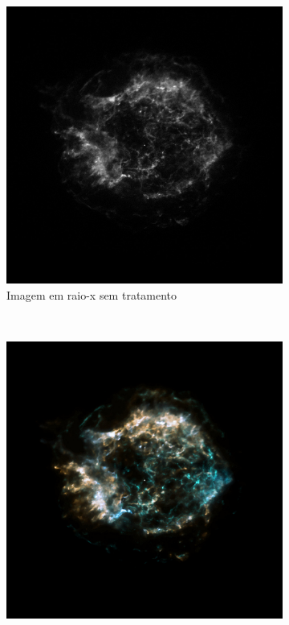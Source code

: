 \documentclass[
	article,			%
	12pt,				%
	oneside,			%
	a4paper,			%
	english,			%
	brazil,				%
	sumario=tradicional
	]{abntex2}
\begin{document}
\begin{figure}
    \centering
    \begin{subfigure}[hb]{0.45\textwidth}
        \includegraphics[width=\textwidth]{img/bnwspace}
        \caption{Imagem em raio-x sem tratamento}
        \label{fig:bnwspace}
    \end{subfigure}
    ~ %
    \begin{subfigure}[hb]{0.45\textwidth}
        \includegraphics[width=\textwidth]{img/colorspace}

\end{subfigure}
\end{figure}
\end{document}
